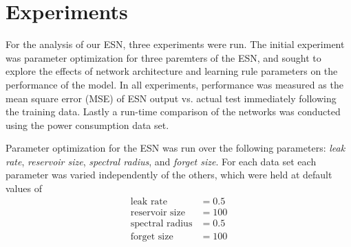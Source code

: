 \documentclass{acm_proc_article-sp}
\begin{document}
\section{Experiments}
For the analysis of our ESN, three experiments were run. The initial experiment was parameter optimization for three paremters of the ESN, and sought to explore the effects of network architecture and learning rule parameters on the performance of the model. In all experiments, performance was measured as the mean square error (MSE) of ESN output vs. actual test immediately following the training data. Lastly a run-time comparison of the networks was conducted using the power consumption data set.

Parameter optimization for the ESN was run over the following parameters: \emph{leak rate}, \emph{reservoir size}, \emph{spectral radius}, and \emph{forget size}. For each data set each parameter was varied independently of the others, which were held at default values of
\begin{align*}
\text{leak rate} &= 0.5 \\
\text{reservoir size} &= 100 \\
\text{spectral radius} &= 0.5 \\
\text{forget size} &= 100
\end{align*}
\end{document}
